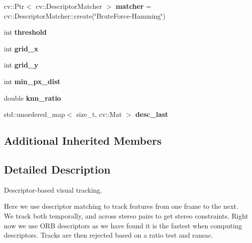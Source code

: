 \begin{DoxyCompactItemize}
\item 
\mbox{\label{classov__core_1_1TrackDescriptor_a0b7f0798d71dc4a3f803098e097f7eb9}} 
cv\+::\+Ptr$<$ cv\+::\+Descriptor\+Matcher $>$ {\bfseries matcher} = cv\+::\+Descriptor\+Matcher\+::create(\char`\"{}Brute\+Force-\/Hamming\char`\"{})
\item 
\mbox{\label{classov__core_1_1TrackDescriptor_a150ead1b37d1a8a2319d6c2d9b955d46}} 
int {\bfseries threshold}
\item 
\mbox{\label{classov__core_1_1TrackDescriptor_ad44a5a5edd9eb38b442b71c7c68630fa}} 
int {\bfseries grid\+\_\+x}
\item 
\mbox{\label{classov__core_1_1TrackDescriptor_a842119cdd662e4bcbab084187706e991}} 
int {\bfseries grid\+\_\+y}
\item 
\mbox{\label{classov__core_1_1TrackDescriptor_a8d410818845fb5d57615f8e87862b8dc}} 
int {\bfseries min\+\_\+px\+\_\+dist}
\item 
\mbox{\label{classov__core_1_1TrackDescriptor_a80c29687d05a0f34e5ed7f09702fc8f1}} 
double {\bfseries knn\+\_\+ratio}
\item 
\mbox{\label{classov__core_1_1TrackDescriptor_a887713e7440883d8d7e3c58efd0fa155}} 
std\+::unordered\+\_\+map$<$ size\+\_\+t, cv\+::\+Mat $>$ {\bfseries desc\+\_\+last}
\end{DoxyCompactItemize}
\subsection*{Additional Inherited Members}


\subsection{Detailed Description}
Descriptor-\/based visual tracking. 

Here we use descriptor matching to track features from one frame to the next. We track both temporally, and across stereo pairs to get stereo constraints. Right now we use O\+RB descriptors as we have found it is the fastest when computing descriptors. Tracks are then rejected based on a ratio test and ransac. 

